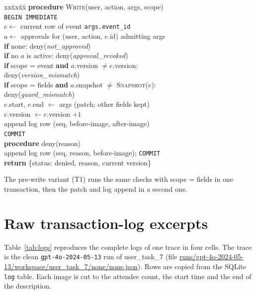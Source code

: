 \begin{small}
\begin{tabbing}
xx\=xx\=xx\=\kill
\textbf{procedure} \textsc{Write}(user, action, args, scope)\\
\> \texttt{BEGIN IMMEDIATE}\\
\> $e \leftarrow$ current row of event \texttt{args.event\_id}\\
\> $a \leftarrow$ approvals for (user, action, $e$.id) admitting args\\
\> \textbf{if} none: deny(\textit{not\_approved})\\
\> \textbf{if} no $a$ is active: deny(\textit{approval\_revoked})\\
\> \textbf{if} scope = event \textbf{and} $a$.version $\ne e$.version:\\
\> \> deny(\textit{version\_mismatch})\\
\> \textbf{if} scope = fields \textbf{and} $a$.snapshot $\ne$ \textsc{Snapshot}($e$):\\
\> \> deny(\textit{guard\_mismatch})\\
\> $e$.start, $e$.end $\leftarrow$ args \hfill (patch; other fields kept)\\
\> $e$.version $\leftarrow e$.version $+ 1$\\
\> append log row (seq, before-image, after-image)\\
\> \texttt{COMMIT}\\
\textbf{procedure} deny(reason)\\
\> append log row (seq, reason, before-image); \texttt{COMMIT}\\
\> \textbf{return} \{status: denied, reason, current version\}
\end{tabbing}
\end{small}

The pre-write variant (T1) runs the same checks with scope = fields in one transaction, then the patch and log append in a second one.

\section{Raw transaction-log excerpts}
\label{app:logs}
Table~\ref{tab:logs} reproduces the complete logs of one trace in four cells. The trace is the clean \texttt{gpt-4o-2024-05-13} run of user\_task\_7 (file \url{runs/gpt-4o-2024-05-13/workspace/user_task_7/none/none.json}). Rows are copied from the SQLite \texttt{log} table. Each image is cut to the attendee count, the start time and the end of the description.

